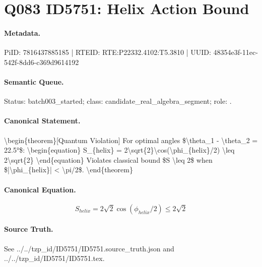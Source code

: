 \section*{Q083 ID5751: Helix Action Bound}
\paragraph{Metadata.}
PiID: 7816437885185 | RTEID: RTE:P22332.4102:T5.3810 | UUID: 48354e3f-11ec-542f-8dd6-c369d9614192

\paragraph{Semantic Queue.}
Status: batch003\_started; class: candidate\_real\_algebra\_segment; role: .

\paragraph{Canonical Statement.}
\textbackslash{}begin\{theorem\}[Quantum Violation] For optimal angles \$\textbackslash{}theta\_1 - \textbackslash{}theta\_2 = 22.5°\$: \textbackslash{}begin\{equation\} S\_\{helix\} = 2\textbackslash{}sqrt\{2\}\textbackslash{}cos(\textbackslash{}phi\_\{helix\}/2) \textbackslash{}leq 2\textbackslash{}sqrt\{2\} \textbackslash{}end\{equation\} Violates classical bound \$S \textbackslash{}leq 2\$ when \$|\textbackslash{}phi\_\{helix\}| < \textbackslash{}pi/2\$. \textbackslash{}end\{theorem\}

\paragraph{Canonical Equation.}
\[
\begin{equation} S_{helix} = 2\sqrt{2}\cos(\phi_{helix}/2) \leq 2\sqrt{2} \end{equation}
\]

\paragraph{Source Truth.}
See ../../tzp\_id/ID5751/ID5751.source\_truth.json and ../../tzp\_id/ID5751/ID5751.tex.
